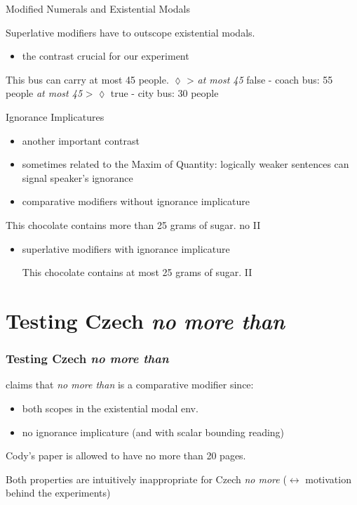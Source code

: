 \documentclass[10pt
]{beamer}
\begin{document}
\begin{frame}{Modified Numerals and Existential Modals}

  Superlative modifiers have to outscope existential modals.

  \begin{itemize}
    \item the contrast crucial for our experiment
  \end{itemize}
  
  
   \pex This bus can carry at most 45 people.
    \a *$\lozenge$ > \textit{at most 45} \hfill false - coach bus: 55 people
    \a \textit{at most 45} > $\lozenge$ \hfill true - city bus: 30 people
    \xe
  
  \footnotesize
  
  \footnotesize
  \cite{geurts2007least,blok2019scope}
  
  
  \end{frame}
  

\begin{frame}{Ignorance Implicatures}
\begin{itemize}
    \item another important contrast
    \item sometimes related to the Maxim of Quantity: logically weaker sentences can signal speaker's ignorance
    \item comparative modifiers without ignorance implicature
\end{itemize}

\ex 
This chocolate contains more than 25 grams of sugar. \hfill no II
\xe

\begin{itemize}
    \item superlative modifiers with ignorance implicature

\ex This chocolate contains at most 25 grams of sugar. \hfill II
\xe 

\end{itemize}
\end{frame}


\section{Testing Czech \textit{no more than}}

\begin{frame}
  \frametitle{Testing Czech \textit{no more than}}

  \cite{nouwen2008upper} claims that \textit{no more than} is a comparative modifier since:

  \begin{itemize}
    \item both scopes in the existential modal env.
    \item no ignorance implicature (and with scalar bounding reading)
  \end{itemize}

\ex  Cody’s paper is allowed to have no more than 20 pages.  
\xe  

Both properties are intuitively inappropriate for Czech \textit{no more} ($\leftrightarrow$ motivation behind the experiments)

\end{frame}
\end{document}
